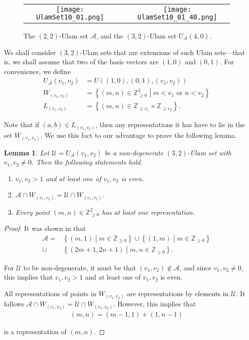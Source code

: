 \documentclass{amsart}
\newcommand{\ZZ}{\mathbb{Z}}
\newcommand{\U}{\mathcal{U}}
\newcommand{\A}{\mathcal{A}}
\theoremstyle{theorem}
\newtheorem{lemma}{Lemma}[section]
\theoremstyle{definition}
\begin{document}
\begin{figure}
	\begin{tabular}{ccc}
    \texttt{[image: UlamSet10\_01.png]} & & \texttt{[image: UlamSet10\_01\_40.png]}
    \end{tabular}
	\caption{The $(2,2)$-Ulam set $\A$, and the $(3,2)$-Ulam set $U_\A(4,0)$.}
    \label{base lattice}
\end{figure}

We shall consider $(3,2)$-Ulam sets that are extensions of such Ulam sets---that is, we shall assume that two of the basis vectors are $(1,0)$ and $(0,1)$. For convenience, we define
	\begin{align*}
    U_\A(v_1, v_2) &= U\left((1,0),(0,1),(v_1,v_2)\right) \\
    W_{(v_1, v_2)} &= \left\{(m,n) \in \ZZ_{\geq 0}^2 \middle| m < v_1 \text{ or } n < v_2 \right\} \\
    L_{(v_1, v_2)} &= \left\{(m,n) \in \ZZ_{\geq v_1} \times \ZZ_{\geq v_2}\right\}.
    \end{align*}
    
\noindent Note that if $(a,b) \in L_{(v_1, v_2)}$, then any representations it has have to lie in the set $W_{(v_1, v_2)}$. We use this fact to our advantage to prove the following lemma.

\begin{lemma}\label{Basic Structural Lemma}
Let $\U = U_\A(v_1, v_2)$ be a non-degenerate $(3,2)$-Ulam set with $v_1, v_2 \neq 0$. Then the following statements hold.
	\begin{enumerate}
    \item $v_1, v_2 > 1$ and at least one of $v_1, v_2$ is even.
    \item $\A \cap W_{(v_1, v_2)} = \U \cap W_{(v_1, v_2)}$.
    \item Every point $(m,n) \in \ZZ_{\geq 0}^2$ has at least one representation.
    \end{enumerate}
\end{lemma}

\begin{proof}
It was shown in \cite{kravitz_steinerberger_2017} that
	\begin{align*}
    \A = &\left\{(m,1) \middle| m \in \ZZ_{\geq 0}\right\} \cup \left\{(1,m) \middle| m \in \ZZ_{\geq 0}\right\} \\
    \cup &\left\{(2m + 1, 2n + 1) \middle| m,n \in \ZZ_{\geq 0}\right\}.
    \end{align*}
    
\noindent For $\U$ to be non-degenerate, it must be that $(v_1, v_2) \notin \A$, and since $v_1, v_2 \neq 0$, this implies that $v_1, v_2 > 1$ and at least one of $v_1, v_2$ is even.

All representations of points in $W_{(v_1, v_2)}$ are representations by elements in $\U$. It follows $\A \cap W_{(v_1, v_2)} = \U \cap W_{(v_1, v_2)}$.  However, this implies that
	\begin{align*}
    (m, n) = (m - 1, 1) + (1, n - 1)
    \end{align*}
    
 \noindent is a representation of $(m,n)$.
\end{proof}
\end{document}
